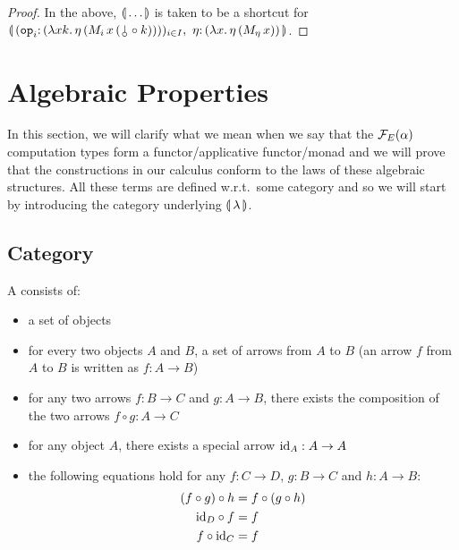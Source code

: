 \begin{proof}
  In the above, $\llparenthesis \, \ldots \, \rrparenthesis$ is taken to be a shortcut for
  $\banana{(\onto{\op{op}_i}{(\lam{x
        k}{\ap{\eta}{(\ap{\ap{M_i}{x}}{(\cherry \circ k)})}})})_{i \in I},\
    \onto{\eta}{(\lam{x}{\etaE{(\ap{M_\eta}{x})}})}}$.
\end{proof}


\section{Algebraic Properties}
\label{sec:algebraic-properties}

In this section, we will clarify what we mean when we say that the
$\mathcal{F}_E(\alpha)$ computation types form a functor/applicative functor/monad
and we will prove that the constructions in our calculus conform to the
laws of these algebraic structures. All these terms are defined w.r.t.\
some category and so we will start by introducing the category underlying
$\llparenthesis \, \lambda \, \rrparenthesis$.

\subsection{Category}
\label{ssec:category}

\begin{definition}
 A  consists of:
\begin{itemize}
\item a set of objects
\item for every two objects $A$ and $B$, a set of arrows from $A$ to $B$
  (an arrow $f$ from $A$ to $B$ is written as $f : A \to B$)
\item for any two arrows $f : B \to C$ and $g : A \to B$, there exists the
  composition of the two arrows $f \circ g : A \to C$
\item for any object $A$, there exists a special arrow $\mathrm{id}_A : A \to A$
\item the following equations hold for any $f : C \to D$, $g : B \to C$ and
  $h : A \to B$:
  \begin{align}
    \label{eq:cat-associativity}(f \circ g) \circ h &= f \circ (g \circ h) \\
    \label{eq:cat-left-identity}\mathrm{id}_D \circ f &= f \\
    \label{eq:cat-right-identity}f \circ \mathrm{id}_C &= f
  \end{align}
\end{itemize}
\end{definition}

